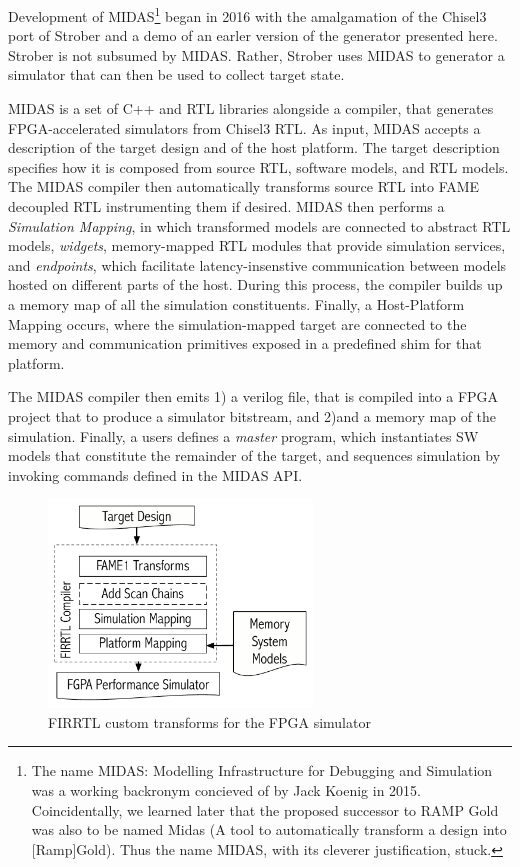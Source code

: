 Development of MIDAS\footnote{The name MIDAS: Modelling Infrastructure for
Debugging and Simulation was a working backronym concieved of by Jack Koenig in
2015. Coincidentally, we learned later that the proposed successor to RAMP Gold
was also to be named Midas (A tool to automatically transform a design into
[Ramp]Gold). Thus the name MIDAS, with its cleverer justification, stuck.} began in 2016
with the amalgamation of the Chisel3 port of Strober and a demo of an earler
version of the generator presented here. Strober is not subsumed by MIDAS.
Rather, Strober uses MIDAS to generator a simulator that can then be used to
collect target state.

MIDAS is a set of C++ and RTL libraries alongside a compiler, that generates
FPGA-accelerated simulators from Chisel3 RTL. As input, MIDAS accepts a
description of the target design and of the host platform. The target
description specifies how it is composed from source RTL, software models, and
RTL models. The MIDAS compiler then automatically transforms source RTL into
FAME decoupled RTL instrumenting them if desired. MIDAS then performs a
\emph{Simulation Mapping}, in which transformed models are connected to
abstract RTL models, \textit{widgets}, memory-mapped RTL modules that provide
simulation services, and \textit{endpoints}, which facilitate
latency-insenstive communication between models hosted on different parts of
the host. During this process, the compiler builds up a memory map of all the
simulation constituents.  Finally, a {Host-Platform Mapping} occurs, where the
simulation-mapped target are connected to the memory and communication
primitives exposed in a predefined shim for that platform.

The MIDAS compiler then emits 1) a verilog file, that is compiled into a FPGA
project that to produce a simulator bitstream, and 2)and a memory map of the
simulation. Finally, a users defines a \emph{master} program, which
instantiates SW models that constitute the remainder of the target, and
sequences simulation by invoking commands defined in the MIDAS API.

\begin{figure}
	\centering
	\includegraphics[width=7cm]{figures/firrtl.pdf}
	\caption{FIRRTL custom transforms for the FPGA simulator}
	\label{fig:firrtl}
\end{figure}

